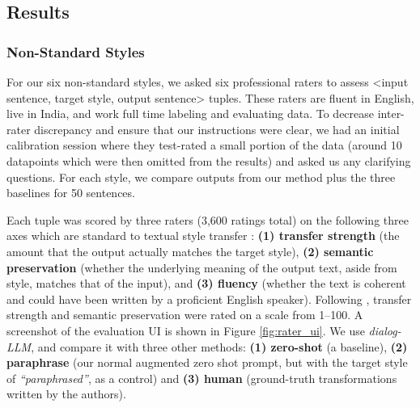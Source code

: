 \subsection{Results}
\subsubsection{Non-Standard Styles}
For our six non-standard styles, we asked six professional raters to assess  <input sentence, target style, output sentence> tuples. These raters are fluent in English, live in India, and work full time labeling and evaluating data. To decrease inter-rater discrepancy and ensure that our instructions were clear, we had an initial calibration session where they test-rated a small portion of the data (around 10 datapoints which were then omitted from the results) and asked us any clarifying questions. For each style, we compare outputs from our method plus the three baselines for 50 sentences.


Each tuple was scored by three raters (3,600 ratings total) on the following three axes which are standard to textual style transfer \citep{DBLP:journals/corr/abs-1904-02295}: \textbf{(1) transfer strength} (the amount that the output actually matches the target style), \textbf{(2) semantic preservation} (whether the underlying meaning of the output text, aside from style, matches that of the input), and \textbf{(3) fluency} (whether the text is coherent and could have been written by a proficient English speaker). Following \citet{sakaguchi-van-durme-2018-efficient}, transfer strength and semantic preservation were rated on a scale from 1--100. A screenshot of the evaluation UI is shown in Figure \ref{fig:rater_ui}.
We use \textit{dialog-LLM}, and compare it with three other methods: \textbf{(1) zero-shot} (a baseline), \textbf{(2) paraphrase} (our normal augmented zero shot prompt, but with the target style of \textit{``paraphrased''}, as a control) and \textbf{(3) human} (ground-truth transformations written by the authors).

